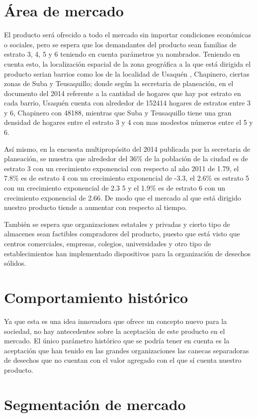 \documentclass[letterpaper,12pt]{scrreprt}
\begin{document}
    \section{Área de mercado}
    El producto será ofrecido a todo el mercado sin importar condiciones económicas o sociales, pero se espera que los demandantes del producto sean  familias de estrato 3, 4, 5 y 6 teniendo en cuenta parámetros ya nombrados. Teniendo en cuenta esto, la localización espacial de la zona geográfica a la que está dirigida el producto serian barrios como los de la localidad de Usaquén , Chapinero, ciertas zonas de Suba y Teusaquillo; donde según la secretaria de planeación, en el documento del 2014 referente a la cantidad de hogares que hay por estrato en cada barrio, Usaquén cuenta con alrededor de 152414 hogares de estratos entre 3 y 6, Chapinero con 48188, mientras que Suba y Teusaquillo tiene una gran densidad de hogares entre el estrato 3 y 4 con mas modestos números entre el 5 y 6.

    Así mismo, en la encuesta multipropósito del 2014 publicada por la secretaria de planeación, se muestra que  alrededor del 36\% de la población de la ciudad es de estrato 3 con un crecimiento exponencial con respecto al año 2011 de 1.79, el 7.8\%  es de estrato 4 con un crecimiento exponencial de -3.3, el 2.6\% es estrato 5 con un crecimiento exponencial de 2.3 5 y el 1.9\% es de estrato 6 con un crecimiento exponencial de 2.66. De modo que el mercado al que está dirigido nuestro producto tiende a aumentar con respecto al tiempo.

    También se espera que organizaciones estatales y privadas y cierto tipo de almacenes sean factibles compradores del producto, puesto que está visto que centros comerciales, empresas, colegios, universidades y otro tipo de establecimientos han implementado dispositivos para la organización de desechos sólidos.

    \section{Comportamiento histórico}
    Ya que esta es una idea innovadora que ofrece un concepto nuevo para la sociedad, no hay antecedentes sobre la aceptación de este producto en el mercado. El único parámetro histórico que se podría tener en cuenta es la aceptación que han tenido en las grandes organizaciones las canecas separadoras de desechos que no cuentan con el valor agregado con el que sí cuenta nuestro producto.

    \section{Segmentación de mercado}
\end{document}
